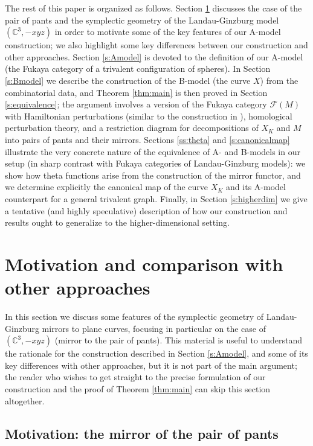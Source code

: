 \documentclass[11pt,leqno]{amsart}
\numberwithin{equation}{section}
\def\C{\mathbb{C}}
\def\F{{\mathcal F}}
\begin{document}
The rest of this paper is organized as follows. Section \ref{s:pantsmotivate} 
discusses the case of the pair of pants and
the symplectic geometry of the Landau-Ginzburg model $(\C^3,-xyz)$ in order
to motivate some of the key features of our A-model construction; we also
highlight some key differences between our construction and other approaches.
Section \ref{s:Amodel} is devoted to the definition of our A-model (the Fukaya category 
of a trivalent configuration of spheres).
In Section \ref{s:Bmodel} we describe the construction of the B-model (the curve
$X$) from the combinatorial data, and Theorem \ref{thm:main} is then proved in
Section \ref{s:equivalence}; the argument involves a version of
the Fukaya category $\F(M)$ with Hamiltonian perturbations
(similar to the construction in \cite{Lee}),
homological perturbation theory, and a restriction diagram 
for decompositions of $X_K$ and $M$ into pairs of pants and their mirrors.  
Sections \ref{ss:theta} and \ref{s:canonicalmap} illustrate the very concrete nature of the
equivalence of A- and B-models in our setup (in sharp contrast with Fukaya
categories of Landau-Ginzburg models): we show how theta functions arise
from the construction of the mirror functor, and we
determine explicitly the canonical map of the curve $X_K$ and its A-model 
counterpart for a general trivalent graph. 
Finally, in Section \ref{s:higherdim} we give a tentative (and highly
speculative) description of how our construction and results ought to generalize
to the higher-dimensional setting.

\section{Motivation and comparison with other approaches} \label{s:pantsmotivate}

In this section we discuss some features of the symplectic geometry of
Landau-Ginzburg mirrors to plane curves, focusing in particular on the
case of $(\C^3,-xyz)$ (mirror to the pair of pants).
This material is useful to understand the rationale
for the construction described in Section \ref{s:Amodel}, and some of its
key differences with other approaches, but it is not
part of the main argument; the reader who wishes to get straight to the
precise formulation of our construction and the proof of Theorem
\ref{thm:main} can skip this section altogether.

\subsection{Motivation: the mirror of the pair of pants} 
\end{document}
